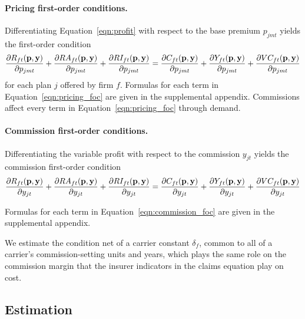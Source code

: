 \documentclass[12pt]{article}
\begin{document}
\paragraph{Pricing first-order conditions.} Differentiating Equation~\eqref{eqn:profit} with respect to the base premium $p_{jmt}$ yields the first-order condition
\begin{equation}
\label{eqn:pricing_foc}
	\frac{\partial R_{ft}({\bf p},{\bf y})}{\partial p_{jmt}} + \frac{\partial RA_{ft}({\bf p},{\bf y})}{\partial p_{jmt}}  + \frac{\partial RI_{ft}({\bf p},{\bf y})}{\partial p_{jmt}} =  \frac{\partial C_{ft}({\bf p},{\bf y})}{\partial p_{jmt}} + \frac{\partial Y_{ft}({\bf p},{\bf y})}{\partial p_{jmt}} + \frac{\partial VC_{ft}({\bf p},{\bf y})}{\partial p_{jmt}}
\end{equation}
for each plan $j$ offered by firm $f$. Formulas for each term in Equation~\eqref{eqn:pricing_foc} are given in the supplemental appendix.  Commissions affect every term in Equation~\eqref{eqn:pricing_foc} through demand.


\paragraph{Commission first-order conditions.} Differentiating the variable profit with respect to the commission $y_{jt}$ yields the commission first-order condition
\begin{equation}
\label{eqn:commission_foc}
	\frac{\partial R_{ft}({\bf p},{\bf y})}{\partial y_{jt}} + \frac{\partial RA_{ft}({\bf p},{\bf y})}{\partial y_{jt}}  + \frac{\partial RI_{ft}({\bf p},{\bf y})}{\partial y_{jt}} =  \frac{\partial C_{ft}({\bf p},{\bf y})}{\partial y_{jt}} + \frac{\partial Y_{ft}({\bf p},{\bf y})}{\partial y_{jt}} + \frac{\partial VC_{ft}({\bf p},{\bf y})}{\partial y_{jt}}
\end{equation}

\noindent Formulas for each term in Equation~\eqref{eqn:commission_foc} are given in the supplemental appendix.

We estimate the condition net of a carrier constant $\delta_f$, common to all of a carrier's commission-setting units and years, which plays the same role on the commission margin that the insurer indicators in the claims equation play on cost.

\subsection{Estimation}
\label{subsec:estimation}
\end{document}
